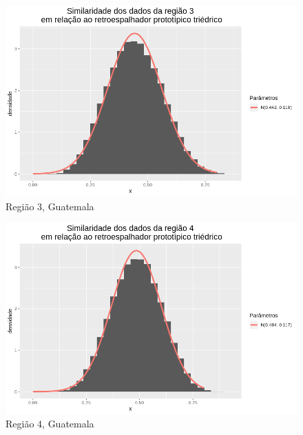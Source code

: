 \documentclass[12pt]{article}
\begin{document}
\begin{figure}[!h]
    \centering
    \vspace{0.15\linewidth}
    \includegraphics[width = 0.95\linewidth]{../../Images/Report_18_12_17/tri_region3.png}
    \caption{Região 3, Guatemala}
    \label{fig:tri_r3}
\end{figure}

\begin{figure}[!h]
    \centering    
    \vspace{0.1\linewidth}
    \includegraphics[width = 0.95\linewidth]{../../Images/Report_18_12_17/tri_region4.png}
    \caption{Região 4, Guatemala}
    \label{fig:tri_r4}
\end{figure}
\end{document}
